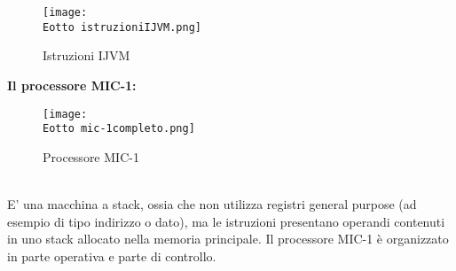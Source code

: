 \documentclass[12pt]{article}
\def \Eotto {Allegati/Esercizio8/}
\begin{document}
\begin{figure}[ht!]
    \centering
    \texttt{[image: \\Eotto istruzioniIJVM.png]}
    \caption{Istruzioni IJVM}
\end{figure}
\clearpage
{\large \textbf{Il processore MIC-1:}}
\begin{figure}[ht!]
    \centering
    \texttt{[image: \\Eotto mic-1completo.png]}
    \caption{Processore MIC-1}
\end{figure}
\\E’ una macchina a stack, ossia che non utilizza registri general purpose (ad esempio di tipo indirizzo o dato), ma le istruzioni presentano operandi contenuti in uno stack allocato nella memoria principale. Il processore MIC-1 è organizzato in parte operativa e parte di controllo.
\clearpage
\end{document}
